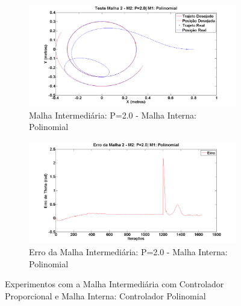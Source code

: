     \begin{figure}[!htb]
    	\centering
    	\begin{subfigure}{1.0\textwidth}
    		\centering
    		\includegraphics[width=.9\linewidth]{./Testes/Malha2/P2.0/Polinomial/m2PosPol}
    		\caption{Malha Intermediária: P=2.0 - Malha Interna: Polinomial}
    		\label{fig:m2polpos}
    	\end{subfigure}
    	\begin{subfigure}{1.0\textwidth}
    		\centering
    		\includegraphics[width=.9\linewidth]{./Testes/Malha2/P2.0/Polinomial/m2ErroTheta}
    		\caption{Erro da Malha Intermediária: P=2.0 - Malha Interna: Polinomial}
    		\label{fig:m2pol2pos}
    	\end{subfigure}
    	\caption{Experimentos com a Malha Intermediária com Controlador Proporcional e Malha Interna: Controlador Polinomial}
    	\label{fig:m2pol}
    \end{figure}
 
